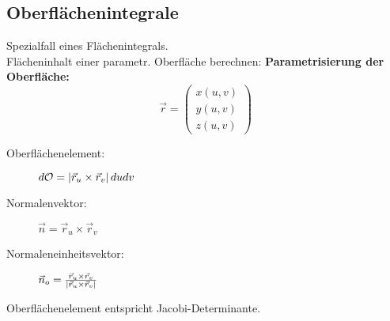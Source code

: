 \subsection{Oberflächenintegrale}
    Spezialfall eines Flächenintegrals.\\    
    Flächeninhalt einer parametr. Oberfläche berechnen:
    \textbf{Parametrisierung der Oberfläche:}
    $$
        \vec{r} = \begin{pmatrix}
            x(u,v)\\
            y(u,v)\\
            z(u,v)
        \end{pmatrix}
    $$
    \begin{description}
        \item[Oberflächenelement:] $d\mathcal{O} = \abs*{\vec{r}_u \times \vec{r}_v} du dv$
        \item[Normalenvektor:]  $\vec{n} = \vec{r}_u \times \vec{r}_v$
        \item[Normaleneinheitsvektor:]  $\vec{n}_o = \frac{\vec{r}_u \times \vec{r}_v}{\abs*{\vec{r}_u \times \vec{r}_v}}$
    \end{description}
    {\small Oberflächenelement entspricht Jacobi-Determinante.}
